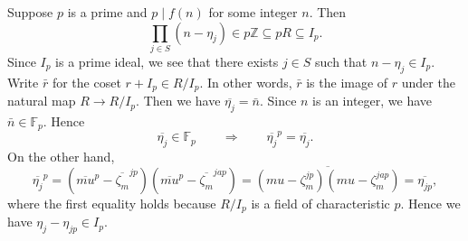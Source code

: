 \documentclass{article}
\def\Z{{\mathbb Z}}
\def\F{{\mathbb F}}
\def\Z{{\mathbb Z}}
\def\F{{\mathbb F}}
\newtheorem{lemma}[subsection]{Lemma}
\newenvironment{proof}{\noindent {\bf Proof:}}{$\Box$ \vspace{2 ex}}
\begin{document}
\begin{comment}
    \begin{lemma}
    Suppose $p\nmid m$. Then $p\notin I_p^2$.
\end{lemma}

\begin{proof}
    Suppose for a contradiction that $p \in I_p^2 = (p^2, pg(\zeta_m), g(\zeta_m)^2).$ Let $a(x),b(x),c(x)\in\Z[x]$ such that $$p = p^2a(\zeta_m) + pg(\zeta_m)b(\zeta_m) + g(\zeta_m)^2c(\zeta_m).$$
    Reducing mod $p$, we see that $$\pi_p(\Phi_m(x))\mid g_0(x)^2\pi_p(c(x)).$$
    Write $\pi_p(\Phi_m(x)) = g_0(x)h_0(x)$ for some $h_0(x)\in\F_p[x]$. Then we have $$h_0(x)\mid g_0(x)\pi_p(c(x)).$$
    Since $\pi_p(\Phi_m(x))$ has no repeated factors, we see that $g_0(x)$ does not divide $h_0(x)$. Since $g_0(x)$ is irreducible, we have $h_0(x)\mid\pi_p(c(x)).$ (\textbf{Exercise}: prove this via $(g_0(x),h_0(x)) = \F_p[x]$.)

    Let $h(x)\in\Z[x]$ be any lift of $h_0(x)$ so that $\Phi_m(x) = g(x)h(x) + pj(x)$  and $c(x) = h(x)k(x) + p\ell(x)$ for some $j(x),k(x), \ell(x)\in\Z[x]$. In other words, we have
    \begin{eqnarray*}
        p &=& p^2a(\zeta_m) + pg(\zeta_m)b(\zeta_m) + g(\zeta_m)^2(h(\zeta_m)k(\zeta_m) + p\ell(\zeta_m))\\
        &=& p^2a(\zeta_m) + pg(\zeta_m)\Big(b(\zeta_m) + g(\zeta_m)\ell(\zeta_m) + j(\zeta_m)+k(\zeta_m)\Big).
    \end{eqnarray*}
    Dividing by $p$ gives $1\in (p, g(\zeta_m)) = I_p$, which contradicts the fact that $I_p$ is a prime ideal.
\end{proof}
\end{comment}

Suppose $p$ is a prime and $p\mid f(n)$ for some integer $n$. Then
$$\prod_{j\in S}(n - \eta_j) \in p\Z \subseteq pR\subseteq I_p.$$
Since $I_p$ is a prime ideal, we see that there exists $j\in S$ such that $n - \eta_j \in I_p$. Write $\bar{r}$ for the coset $r + I_p\in R/I_p$. In other words, $\bar{r}$ is the image of $r$ under the natural map $R\rightarrow R/I_p$. Then we have $\overline{\eta_j} = \bar{n}$. Since $n$ is an integer, we have $\bar{n}\in\F_p$. Hence $$\overline{\eta_j} \in\F_p \qquad\Longrightarrow\qquad \overline{\eta_j}^p = \overline{\eta_j}.$$ On the other hand,
$$\overline{\eta_j}^p = (\overline{mu}^p - \overline{\zeta_m}^{jp})(\overline{mu}^p - \overline{\zeta_m}^{jap}) = \overline{(mu - \zeta_m^{jp})(mu - \zeta_m^{jap})} = \overline{\eta_{jp}},$$
where the first equality holds because $R/I_p$ is a field of characteristic $p$. Hence we have $\eta_j - \eta_{jp}\in I_p$.
\end{document}

